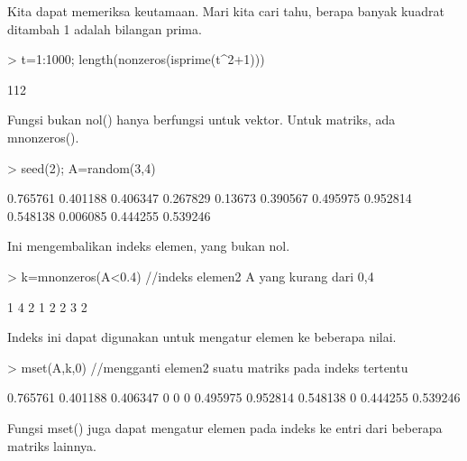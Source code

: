 \documentclass[a4paper,10pt]{article}
\begin{document}
\begin{eulernotebook}
\begin{eulercomment}
\begin{eulercomment}
\begin{eulercomment}
\begin{eulercomment}
\begin{eulercomment}
\begin{eulercomment}
\begin{eulercomment}
Kita dapat memeriksa keutamaan. Mari kita cari tahu, berapa banyak
kuadrat ditambah 1 adalah bilangan prima.
\end{eulercomment}
\begin{eulerprompt}
> t=1:1000; length(nonzeros(isprime(t^2+1)))
\end{eulerprompt}
\begin{euleroutput}
  112
\end{euleroutput}
\begin{eulercomment}
Fungsi bukan nol() hanya berfungsi untuk vektor. Untuk matriks, ada
mnonzeros().
\end{eulercomment}
\begin{eulerprompt}
> seed(2); A=random(3,4)
\end{eulerprompt}
\begin{euleroutput}
       0.765761      0.401188      0.406347      0.267829 
        0.13673      0.390567      0.495975      0.952814 
       0.548138      0.006085      0.444255      0.539246 
\end{euleroutput}
\begin{eulercomment}
Ini mengembalikan indeks elemen, yang bukan nol.
\end{eulercomment}
\begin{eulerprompt}
> k=mnonzeros(A<0.4) //indeks elemen2 A yang kurang dari 0,4
\end{eulerprompt}
\begin{euleroutput}
              1             4 
              2             1 
              2             2 
              3             2 
\end{euleroutput}
\begin{eulercomment}
Indeks ini dapat digunakan untuk mengatur elemen ke beberapa nilai.
\end{eulercomment}
\begin{eulerprompt}
> mset(A,k,0) //mengganti elemen2 suatu matriks pada indeks tertentu
\end{eulerprompt}
\begin{euleroutput}
       0.765761      0.401188      0.406347             0 
              0             0      0.495975      0.952814 
       0.548138             0      0.444255      0.539246 
\end{euleroutput}
\begin{eulercomment}
Fungsi mset() juga dapat mengatur elemen pada indeks ke entri dari
beberapa matriks lainnya.
\end{eulercomment}
\begin{eulerprompt}

\end{eulerprompt}
\end{eulercomment}
\end{eulercomment}
\end{eulercomment}
\end{eulercomment}
\end{eulercomment}
\end{eulercomment}
\end{eulernotebook}
\end{document}
